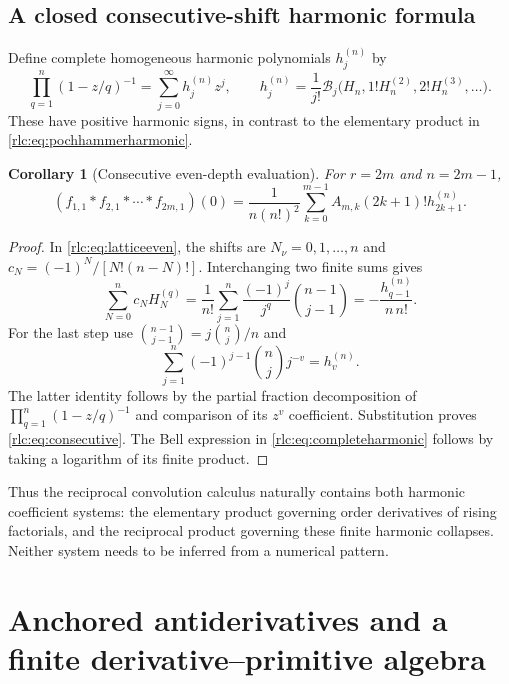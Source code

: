 \documentclass[11pt,a4paper]{article}
\numberwithin{equation}{section}
\newtheorem{corollary}[theorem]{Corollary}
\theoremstyle{definition}\newtheorem{definition}[theorem]{Definition}
\theoremstyle{remark}\newtheorem{remark}[theorem]{Remark}
\begin{document}
\subsection{A closed consecutive-shift harmonic formula}
Define complete homogeneous harmonic polynomials $h_j^{(n)}$ by
\begin{equation}\label{rlc:eq:completeharmonic}
 \prod_{q=1}^n(1-z/q)^{-1}=\sum_{j=0}^\infty h_j^{(n)}z^j,
 \qquad
 h_j^{(n)}=\frac1{j!}\mathcal B_j
       \bigl(H_n,1!H_n^{(2)},2!H_n^{(3)},\ldots\bigr).
\end{equation}
These have positive harmonic signs, in contrast to the elementary
product in \eqref{rlc:eq:pochhammerharmonic}.

\begin{corollary}[Consecutive even-depth evaluation]
\label{rlc:cor:consecutive}
For $r=2m$ and $n=2m-1$,
\begin{equation}\label{rlc:eq:consecutive}
 \boxed{\displaystyle
 (f_{1,1}*f_{2,1}*\cdots*f_{2m,1})(0)
   =\frac1{n(n!)^2}\sum_{k=0}^{m-1}
          A_{m,k}(2k+1)!h_{2k+1}^{(n)}.}
\end{equation}
\end{corollary}
\begin{proof}
In \eqref{rlc:eq:latticeeven}, the shifts are $N_\nu=0,1,\ldots,n$
and $c_N=(-1)^N/[N!(n-N)!]$.
Interchanging two finite sums gives
\[
 \sum_{N=0}^n c_NH_N^{(q)}
 =\frac1{n!}\sum_{j=1}^n\frac{(-1)^j}{j^q}\binom{n-1}{j-1}
 =-\frac{h_{q-1}^{(n)}}{n\,n!}.
\]
For the last step use
$\binom{n-1}{j-1}=j\binom nj/n$ and
\[
 \sum_{j=1}^n(-1)^{j-1}\binom nj j^{-v}=h_v^{(n)}.
\]
The latter identity follows by the partial fraction decomposition of
$\prod_{q=1}^n(1-z/q)^{-1}$ and comparison of its $z^v$ coefficient.
Substitution proves \eqref{rlc:eq:consecutive}. The Bell expression in
\eqref{rlc:eq:completeharmonic} follows by taking a logarithm of its
finite product.
\end{proof}

Thus the reciprocal convolution calculus naturally contains both
harmonic coefficient systems: the elementary product governing order
derivatives of rising factorials, and the reciprocal product governing
these finite harmonic collapses. Neither system needs to be inferred
from a numerical pattern.



\section{Anchored antiderivatives and a finite derivative--primitive algebra}
\label{rlc:sec:primitives}
\end{document}
